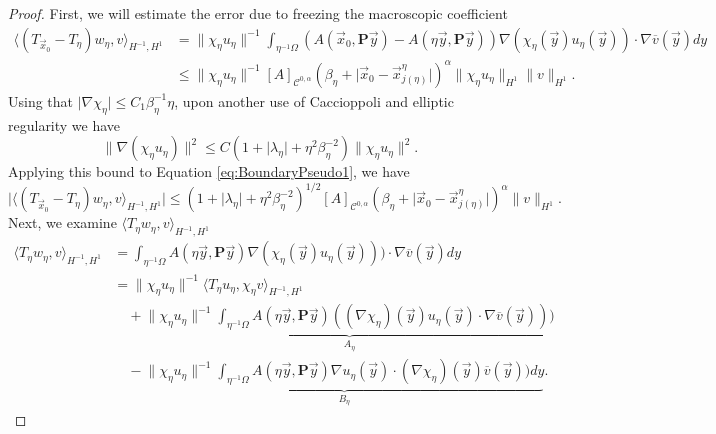 \documentclass[a4paper,reqno]{amsart}
\numberwithin{equation}{section}
\numberwithin{equation}{section}		%
\numberwithin{figure}{section}			%
\numberwithin{table}{section}				%
\theoremstyle{definition}
\newcommand{\<}{\ensuremath \leq}
\renewcommand{\>}{\ensuremath \geq}
\begin{document}
\begin{proof}
    First, we will estimate the error due to freezing the macroscopic coefficient
    \begin{align}
        \langle (T_{\vec{x}_0} -T_{\eta})w_\eta,v \rangle_{H^{-1},H^{1}}&=\lVert \chi_\eta u_\eta\rVert^{-1}\int_{\eta^{-1}\Omega}\left(A\left( \vec{x}_0, \textbf{P}\vec{y}\right) - A\left( \eta\vec{y}, \textbf{P}\vec{y}\right)\right)\nabla(\chi_\eta(\vec{y})u_\eta(\vec{y}))\cdot\nabla \overline{v}(\vec{y})dy \nonumber\\
        &\leq \lVert \chi_\eta u_\eta\rVert^{-1}[A]_{\mathcal{C}^{0,\alpha}}(\beta_\eta + \lvert \vec{x}_0 - \vec{x}_{j(\eta)}^\eta\rvert)^\alpha\lVert \chi_\eta u_\eta\rVert_{H^1}\lVert v \rVert_{H^1}. \label{eq:BoundaryPseudo1}
    \end{align}
    Using that $\lvert \nabla \chi_\eta\rvert \leq C_1\beta_\eta^{-1}\eta$,  upon another use of Caccioppoli and elliptic regularity we have
    \begin{equation}\label{eq: Boundary0}
        \lVert \nabla (\chi_\eta u_\eta)\rVert^2 \leq C(1 + \lvert \lambda_\eta\rvert + \eta^2\beta_\eta^{-2})\lVert \chi_\eta u_\eta\rVert^2.
    \end{equation}
    Applying this bound to Equation \eqref{eq:BoundaryPseudo1}, we have
    \begin{equation}
        \lvert \langle (T_{\vec{x}_0} -T_{\eta})w_\eta,v \rangle_{H^{-1},H^{1}}\rvert\leq (1 + \lvert \lambda_\eta\rvert + \eta^2\beta_\eta^{-2})^{1/2}[A]_{\mathcal{C}^{0,\alpha}}(\beta_\eta + \lvert \vec{x}_0 - \vec{x}_{j(\eta)}^\eta\rvert)^\alpha \lVert v \rVert_{H^1}.
    \end{equation}
    Next, we examine $\langle T_{\eta}w_\eta,v \rangle_{H^{-1},H^{1}}$
    \begin{equation}
        \begin{aligned}
             \langle T_{\eta}w_\eta,v \rangle_{H^{-1},H^{1}}&=\int_{\eta^{-1}\Omega}A\left( \eta\vec{y}, \textbf{P}\vec{y}\right)\nabla(\chi_\eta(\vec{y})u_\eta(\vec{y})))\cdot\nabla \overline{v}(\vec{y})dy\\
             &=\lVert \chi_\eta u_\eta\rVert^{-1} \langle T_{\eta}u_\eta,\chi_\eta v \rangle_{H^{-1},H^{1}}\\
              &\quad + \underbrace{\lVert \chi_\eta u_\eta\rVert^{-1}\int_{\eta^{-1}\Omega}A\left( \eta\vec{y}, \textbf{P}\vec{y}\right)((\nabla\chi_\eta)(\vec{y})u_\eta(\vec{y})\cdot\nabla \overline{v}(\vec{y})))}_{A_\eta}\\
              &\quad- \underbrace{\lVert \chi_\eta u_\eta\rVert^{-1}\int_{\eta^{-1}\Omega}A\left( \eta\vec{y}, \textbf{P}\vec{y}\right)\nabla u_\eta(\vec{y})\cdot (\nabla \chi_\eta)(\vec{y})\overline{v}(\vec{y}))dy}_{B_\eta}.

\end{aligned}
\end{equation}
\end{proof}
\end{document}
